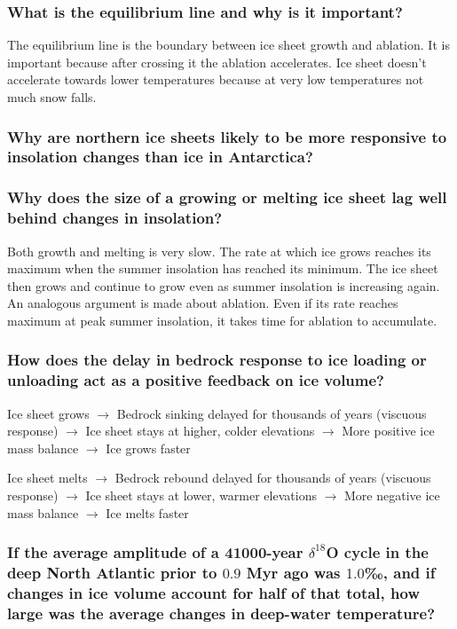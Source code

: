 \subsubsection{What is the equilibrium line and why is it important?}
The equilibrium line is the boundary between ice sheet growth and ablation.
It is important because after crossing it the ablation accelerates. Ice sheet
doesn't accelerate towards lower temperatures because at very low temperatures
not much snow falls.

\subsubsection{Why are northern ice sheets likely to be more responsive to
insolation changes than ice in Antarctica?}

\subsubsection{Why does the size of a growing or melting ice sheet lag well
behind changes in insolation?}
Both growth and melting is very slow. The rate at which ice grows reaches its
maximum when the summer insolation has reached its minimum. The ice sheet then
grows and continue to grow even as summer insolation is increasing again.
An analogous argument is made about ablation. Even if its rate reaches maximum
at peak summer insolation, it takes time for ablation to accumulate.

\subsubsection{How does the delay in bedrock response to ice loading or
unloading act as a positive feedback on ice volume?}
Ice sheet grows $\rightarrow$ Bedrock sinking delayed for thousands of years
(viscuous response) $\rightarrow$ Ice sheet stays at higher, colder elevations
$\rightarrow$ More positive ice mass balance $\rightarrow$ Ice grows faster

Ice sheet melts $\rightarrow$ Bedrock rebound delayed for thousands of years
(viscuous response) $\rightarrow$ Ice sheet stays at lower, warmer elevations
$\rightarrow$ More negative ice mass balance $\rightarrow$ Ice melts faster

\subsubsection{If the average amplitude of a 41000-year $\delta^{18}$O cycle
in the deep North Atlantic prior to $0.9$ Myr ago was $1.0$‰, and if changes
in ice volume account for half of that total, how large was the average changes
in deep-water temperature?}

